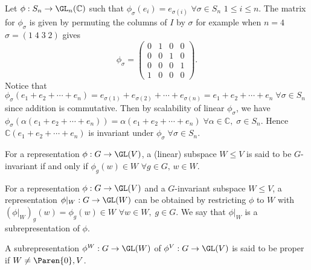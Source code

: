\documentclass[../Project.tex]{subfiles}
\begin{document}
\begin{exam}
	Let $\phi : S_n \to \GL_n(\mathbb{C})$ such that $\phi_\sigma(e_i) = e_{\sigma(i)}$ $\forall \sigma \in S_n$\; $1 \leqslant i \leqslant n$. The matrix for $\phi_\sigma$ is given by permuting the columns of $I$ by $\sigma$\; for example when $n = 4$\; $\sigma = (1\;4\;3\;2)$ gives
	$$\phi_\sigma = \begin{pmatrix} 0 & 1 & 0 & 0 \\
									0 & 0 & 1 & 0\\
									0 & 0 & 0 & 1\\
									1 & 0 & 0 & 0\end{pmatrix}.$$
	Notice that $\phi_{\sigma}(e_1 + e_2 + \cdots + e_n) = e_{\sigma(1)} + e_{\sigma(2)} + \cdots + e_{\sigma(n)} = e_1 + e_2 + \cdots + e_n\; \forall \sigma \in S_n$ since addition is commutative. Then by scalability of linear $\phi_\sigma$, we have $\phi_\sigma(\alpha(e_1 + e_2 + \cdots + e_n)) = \alpha(e_1 + e_2 + \cdots + e_n)\; \forall \alpha \in \mathbb{C},\;\sigma \in S_n$. Hence $\mathbb{C}(e_1 + e_2 + \cdots + e_n)$ is invariant under $\phi_\sigma\;\forall \sigma \in S_n$.
\end{exam}

\begin{defi}
	For a representation $\phi : G \to \GL(V)$, a (linear) subspace $W \leqslant V$ is said to be $G$-invariant if and only if $\phi_g(w) \in W$ $\forall g \in G,\, w \in W$.
\end{defi}

\begin{defi}
	For a representation $\phi : G \to \GL(V)$ and a $G$-invariant subspace $W \leqslant V$, a representation $\phi\vert_W : G \to \GL(W)$ can be obtained by restricting $\phi$ to $W$ with $(\phi\vert_W)_g(w) = \phi_g(w) \in W$ $\forall w \in W,\;g \in G$. We say that $\phi\vert_W$ is a subrepresentation of $\phi$.
\end{defi}

\begin{defi}
	A subrepresentation $\phi^W : G \to \GL(W)$ of $\phi^V : G \to \GL(V)$ is said to be proper if $W \neq \Paren{0},V$.
\end{defi}
\end{document}
